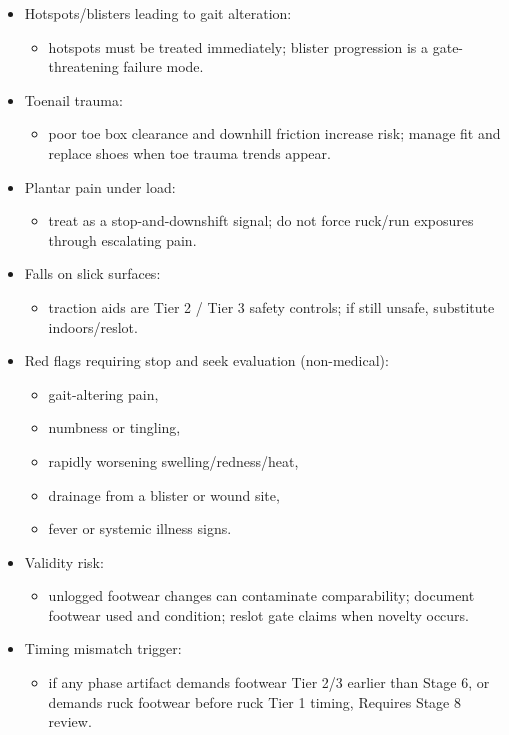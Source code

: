 \documentclass[10pt]{article}
\begin{document}
\begin{itemize}
\item Hotspots/blisters leading to gait alteration:
  \begin{itemize}
  \item hotspots must be treated immediately; blister progression is a gate-threatening failure mode.
  \end{itemize}
\item Toenail trauma:
  \begin{itemize}
  \item poor toe box clearance and downhill friction increase risk; manage fit and replace shoes when toe trauma trends appear.
  \end{itemize}
\item Plantar pain under load:
  \begin{itemize}
  \item treat as a stop-and-downshift signal; do not force ruck/run exposures through escalating pain.
  \end{itemize}
\item Falls on slick surfaces:
  \begin{itemize}
  \item traction aids are Tier 2 / Tier 3 safety controls; if still unsafe, substitute indoors/reslot.
  \end{itemize}
\item Red flags requiring stop and seek evaluation (non-medical):
  \begin{itemize}
  \item gait-altering pain,
  \item numbness or tingling,
  \item rapidly worsening swelling/redness/heat,
  \item drainage from a blister or wound site,
  \item fever or systemic illness signs.
  \end{itemize}
\item Validity risk:
  \begin{itemize}
  \item unlogged footwear changes can contaminate comparability; document footwear used and condition; reslot gate claims when novelty occurs.
  \end{itemize}
\item Timing mismatch trigger:
  \begin{itemize}
  \item if any phase artifact demands footwear Tier 2/3 earlier than Stage 6, or demands ruck footwear before ruck Tier 1 timing, Requires Stage 8 review.
  \end{itemize}
\end{itemize}
\end{document}
